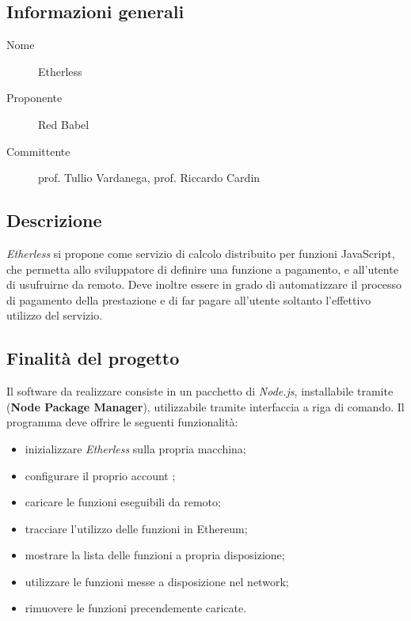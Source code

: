 \documentclass[../studio-di-fattibilita.tex]{subfiles}
\begin{document}
  \subsection{Informazioni generali}%
  \label{subsec:informazioni_generali}
  \begin{description}
    \item[Nome] Etherless
    \item[Proponente] Red Babel
    \item[Committente] prof. Tullio Vardanega, prof. Riccardo Cardin
  \end{description}
  \subsection{Descrizione}%
  \label{subsec:descrizione}
  \textit{Etherless} si propone come servizio di calcolo distribuito per funzioni JavaScript, che permetta allo sviluppatore di definire una funzione a pagamento, e all'utente di usufruirne da remoto. Deve inoltre essere in grado di automatizzare il processo di pagamento della prestazione e di far pagare all'utente soltanto l'effettivo utilizzo del servizio.
  \subsection{Finalità del progetto}%
  \label{subsec:finalita_del_progetto}
  Il software da realizzare consiste in un pacchetto di \textit{Node.js}, installabile tramite  (\textbf{Node Package Manager}), utilizzabile tramite interfaccia a riga di comando.
  Il programma deve offrire le seguenti funzionalità:
  \begin{itemize}
    \item inizializzare \textit{Etherless} sulla propria macchina;
    \item configurare il proprio account ;
    \item caricare le funzioni  eseguibili da remoto;
    \item tracciare l'utilizzo delle funzioni in Ethereum;
    \item mostrare la lista delle funzioni a propria disposizione;
    \item utilizzare le funzioni messe a disposizione nel network;
    \item rimuovere le funzioni precendemente caricate.
  \end{itemize}
\end{document}
